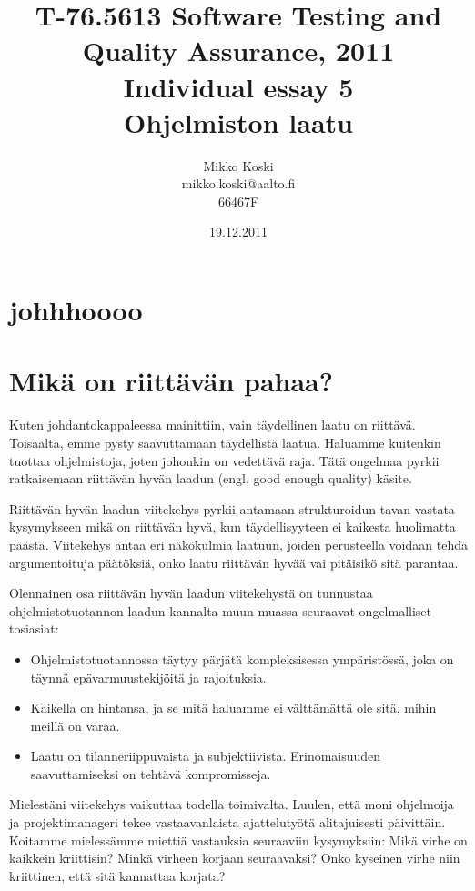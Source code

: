 \documentclass[a4paper]{article}
\begin{document}
\title{\small T-76.5613 Software Testing and Quality Assurance, 2011 \\ Individual essay 5 \\ \huge Ohjelmiston laatu}
\date{19.12.2011}
\author{Mikko Koski \\ mikko.koski@aalto.fi \\ 66467F}
\maketitle

\large

\section{johhhoooo}

\section{Mikä on riittävän pahaa?}

Kuten johdantokappaleessa mainittiin, vain täydellinen laatu on riittävä. Toisaalta, emme pysty saavuttamaan täydellistä laatua. Haluamme kuitenkin tuottaa ohjelmistoja, joten johonkin on vedettävä raja. Tätä ongelmaa pyrkii ratkaisemaan riittävän hyvän laadun (engl. good enough quality) käsite.

Riittävän hyvän laadun viitekehys pyrkii antamaan strukturoidun tavan vastata kysymykseen mikä on riittävän hyvä, kun täydellisyyteen ei kaikesta huolimatta päästä. Viitekehys antaa eri näkökulmia laatuun, joiden perusteella voidaan tehdä argumentoituja päätöksiä, onko laatu riittävän hyvää vai pitäisikö sitä parantaa. \citet{bach1997}

Olennainen osa riittävän hyvän laadun viitekehystä on tunnustaa ohjelmistotuotannon laadun kannalta muun muassa seuraavat ongelmalliset tosiasiat: 

\begin{itemize}
\item Ohjelmistotuotannossa täytyy pärjätä kompleksisessa ympäristössä, joka on täynnä epävarmuustekijöitä ja rajoituksia. 
\item Kaikella on hintansa, ja se mitä haluamme ei välttämättä ole sitä, mihin meillä on varaa. 
\item Laatu on tilanneriippuvaista ja subjektiivista. Erinomaisuuden saavuttamiseksi on tehtävä kompromisseja.
\end{itemize}

Mielestäni viitekehys vaikuttaa todella toimivalta. Luulen, että moni ohjelmoija ja projektimanageri tekee vastaavanlaista ajattelutyötä alitajuisesti päivittäin. Koitamme mielessämme miettiä vastauksia seuraaviin kysymyksiin: Mikä virhe on kaikkein kriittisin? Minkä virheen korjaan seuraavaksi? Onko kyseinen virhe niin kriittinen, että sitä kannattaa korjata?
\end{document}
